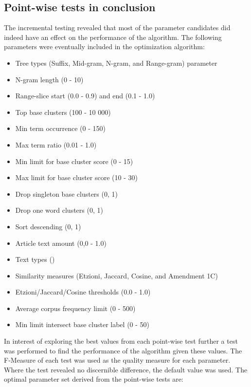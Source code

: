 \subsection{Point-wise tests in conclusion}
\label{subsec:incrementalconclusion}
The incremental testing revealed that most of the parameter candidates did indeed have an effect on the performance of the \CTC algorithm. The following parameters were eventually included in the optimization algorithm:
\begin{itemize}
  \item Tree types (Suffix, Mid-gram, N-gram, and Range-gram) parameter
  \item N-gram length (0 - 10)
  \item Range-slice start (0.0 - 0.9) and end (0.1 - 1.0)
  \item Top base clusters (100 - 10 000)
  \item Min term occurrence (0 - 150)
  \item Max term ratio (0.01 - 1.0)
  \item Min limit for base cluster score (0 - 15)
  \item Max limit for base cluster score (10 - 30)
  \item Drop singleton base clusters (0, 1)
  \item Drop one word clusters (0, 1)
  \item Sort descending (0, 1)
  \item Article text amount (0,0 - 1.0)
  \item Text types ()
  \item Similarity measures (Etzioni, Jaccard, Cosine, and Amendment 1C)
  \item Etzioni/Jaccard/Cosine thresholds (0.0 - 1.0)
  \item Average corpus frequency limit (0 - 500)
  \item Min limit intersect base cluster label (0 - 50)
\end{itemize}
In interest of exploring the best values from each point-wise test further a test was performed to find the performance of the algorithm given these values. The F-Measure of each test was used as the quality measure for each parameter. Where the test revealed no discernible difference, the default value was used. The optimal parameter set derived from the point-wise tests are:

